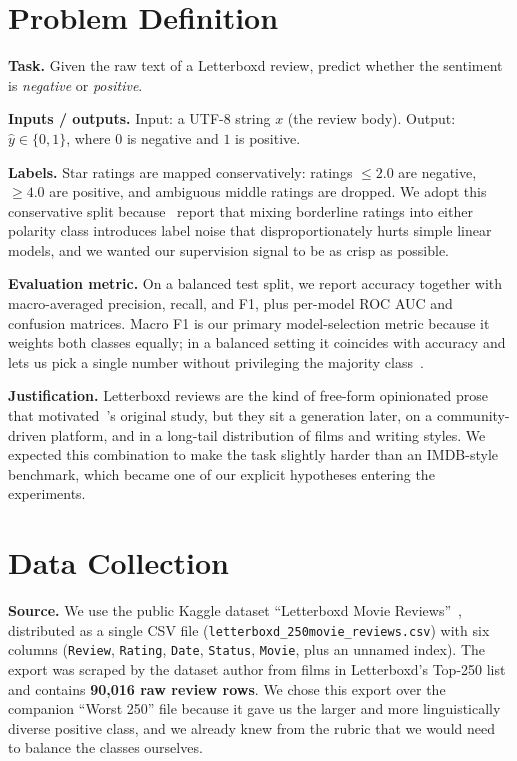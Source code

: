 \documentclass[11pt]{article}
\begin{document}
\section{Problem Definition}
\label{sec:problem}

\textbf{Task.} Given the raw text of a Letterboxd review, predict whether the sentiment is \emph{negative} or \emph{positive}.

\textbf{Inputs / outputs.} Input: a UTF-8 string $x$ (the review body). Output: $\hat{y} \in \{0, 1\}$, where $0$ is negative and $1$ is positive.

\textbf{Labels.} Star ratings are mapped conservatively: ratings $\leq 2.0$ are negative, $\geq 4.0$ are positive, and ambiguous middle ratings are dropped. We adopt this conservative split because~\citet{pang_lee_vaithyanathan_2002} report that mixing borderline ratings into either polarity class introduces label noise that disproportionately hurts simple linear models, and we wanted our supervision signal to be as crisp as possible.

\textbf{Evaluation metric.} On a balanced test split, we report accuracy together with macro-averaged precision, recall, and F1, plus per-model ROC AUC and confusion matrices. Macro F1 is our primary model-selection metric because it weights both classes equally; in a balanced setting it coincides with accuracy and lets us pick a single number without privileging the majority class~\citep{pang_lee_2008}.

\textbf{Justification.} Letterboxd reviews are the kind of free-form opinionated prose that motivated~\citet{pang_lee_vaithyanathan_2002}'s original study, but they sit a generation later, on a community-driven platform, and in a long-tail distribution of films and writing styles. We expected this combination to make the task slightly harder than an IMDB-style benchmark, which became one of our explicit hypotheses entering the experiments.

\section{Data Collection}
\label{sec:data}

\textbf{Source.} We use the public Kaggle dataset ``Letterboxd Movie Reviews''~\citep{kaggle_letterboxd_90k}, distributed as a single CSV file (\texttt{letterboxd\_250movie\_reviews.csv}) with six columns (\texttt{Review}, \texttt{Rating}, \texttt{Date}, \texttt{Status}, \texttt{Movie}, plus an unnamed index). The export was scraped by the dataset author from films in Letterboxd's Top-250 list and contains \textbf{90{,}016 raw review rows}. We chose this export over the companion ``Worst 250'' file because it gave us the larger and more linguistically diverse positive class, and we already knew from the rubric that we would need to balance the classes ourselves.
\end{document}

